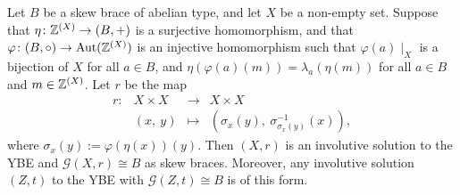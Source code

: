 \begin{proposition}\label{BenDavid}
	Let $B$ be a skew brace of abelian type, and let $X$ be a non-empty set.  Suppose that
	$\eta\colon \mathbb{Z}^{(X)}\to (B,+)$ is a surjective homomorphism,
	and that $\varphi\colon (B,\circ)\to\operatorname{Aut}(\mathbb{Z}^{(X)})$ is an
	injective homomorphism such that $\varphi(a)\mid_X$ is a bijection of $X$
	for all $a\in B$, and $\eta(\varphi(a)(m))=\lambda_a(\eta(m))$ for
	all $a\in B$ and $m\in\mathbb{Z}^{(X)}$. Let $r$ be the map
	$$
	\begin{array}{cccc}
		r\colon & X\times X &\to & X\times X\\
		& (x,~y) &\mapsto &(\sigma_{x}(y),~\sigma^{-1}_{\sigma_{x}(y)}(x)),
	\end{array}
	$$
	where $\sigma_x(y):=\varphi(\eta(x))(y)$. Then $(X,r)$ is an involutive solution to
	the YBE and $\mathcal{G}(X,r)\cong B$ as skew braces. Moreover, any
	involutive solution $(Z,t)$ to the YBE with $\mathcal{G}(Z,t)\cong B$ is of
	this form.
\end{proposition}
